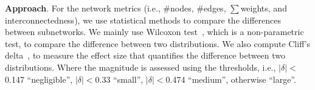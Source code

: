 \documentclass[sigconf]{acmart}
\begin{document}






\noindent\textbf{Approach}. 
For the network metrics (i.e., \#nodes, \#edges, $\sum$weights, and interconnectedness), we use statistical methods to compare the differences between subnetworks. 
We mainly use Wilcoxon test~\cite{gehan1965generalized}, which is a non-parametric test, to compare the difference between two distributions.  We also compute Cliff's delta~\cite{macbeth2011cliff}, to measure the effect size that quantifies the difference between two distributions. 
Where the magnitude is assessed using the thresholds, i.e.,
$|\delta|$$<$0.147 ``negligible'', $|\delta|$$<$0.33 ``small'', $|\delta|$$<$0.474 ``medium'', otherwise ``large''. 

\end{document}
